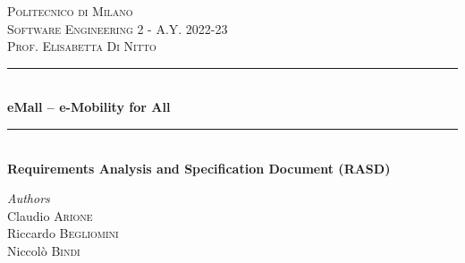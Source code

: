 \begin{titlepage} %
	\newcommand{\HRule}{\rule{\linewidth}{0.5mm}} %
	
	\center %
	
	
	\textsc{\LARGE Politecnico di Milano}\\[1.5cm] %
	
	\textsc{\Large Software Engineering 2 - A.Y. 2022-23}\\[0.5cm] %
	
	\textsc{\large Prof. Elisabetta Di Nitto}\\[0.5cm] %
	
	
	\HRule\\[0.6cm]
	
	{\huge\bfseries eMall – e-Mobility for All}\\[0.4cm]
    
	
	\HRule\\[0.4cm]
	{\Large\bfseries Requirements Analysis and Specification Document (RASD)}\\[1.2cm]
	
	\begin{minipage}{0.4\textwidth}
		\begin{flushleft}
			\large
			\textit{Authors}\\
            Claudio \textsc{Arione} \\
            Riccardo \textsc{Begliomini} \\
			Niccolò \textsc{Bindi}
		\end{flushleft}
	\end{minipage}
	~
	\begin{minipage}{0.4\textwidth}
		\begin{flushright}
			
		\end{flushright}
	\end{minipage}
	

\end{titlepage}
